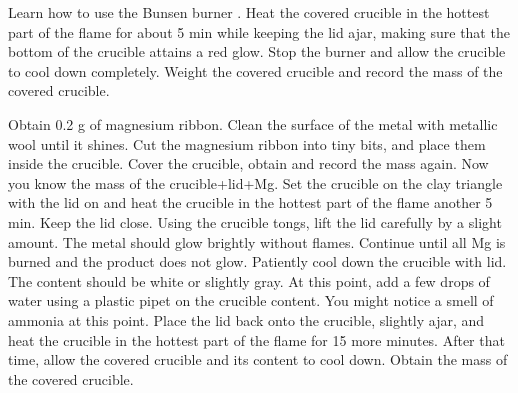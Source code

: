 \documentclass[main.tex]{subfiles}
\begin{document}
\begin{fullwidth}
\begin{steps}
        \newstep[] Learn how to use the Bunsen burner . Heat the covered crucible in the hottest part of the flame for about 5 min while keeping the lid ajar, making sure that the bottom of the crucible attains a red glow.
       \newstep[] Stop the burner and allow the crucible to cool down completely. Weight the covered crucible and record the mass of the covered crucible.     
\end{steps}
\begin{steps}[resume]
    \newstep[] Obtain 0.2 g of magnesium ribbon. Clean the surface of the metal with metallic wool until it shines. Cut the magnesium ribbon into tiny bits, and place them inside the crucible. Cover the crucible, obtain and record the mass again. Now you know the mass of the crucible+lid+Mg.
       \newstep[] Set the crucible on the clay triangle with the lid on and heat the crucible  in the hottest part of the flame another 5 min. Keep the lid close. Using the crucible tongs, lift the lid carefully by a slight amount. The metal should glow brightly without flames. Continue until all Mg is burned and the product does not glow.
              \newstep[] Patiently cool down the crucible with lid. The content should be white or slightly gray. At this point, add a few drops of water using a plastic pipet on the crucible content. You might notice a smell of ammonia at this point.
       \newstep[] Place the lid back onto the crucible, slightly ajar, and heat the crucible  in the hottest part of the flame for 15 more minutes. After that time, allow the covered crucible and its content to cool down. Obtain the mass of the covered crucible.
       \end{steps}
     
      
\end{fullwidth}






 
\end{document}
